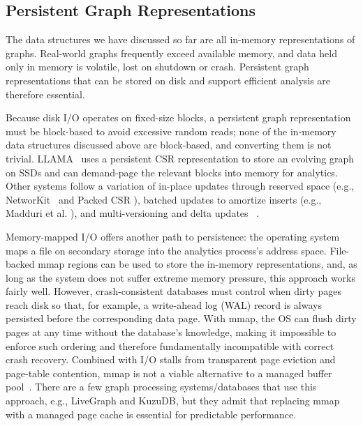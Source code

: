 \subsection{Persistent Graph Representations}
\label{sec:bg:persistent}
The data structures we have discussed so far are all in-memory representations of graphs.
Real-world graphs frequently exceed available memory, and data held only in memory is volatile, lost on shutdown or crash.
Persistent graph representations that can be stored on disk and support efficient analysis are therefore essential.

Because disk I/O operates on fixed-size blocks, a persistent graph representation must be block-based to avoid excessive random reads; none of the in-memory data structures discussed above are block-based, and converting them is not trivial.
LLAMA~\cite{llama} uses a persistent CSR representation to store an evolving graph on SSDs and can demand-page the relevant blocks into memory for analytics.
Other systems follow a variation of in-place updates through reserved space (e.g., NetworKit~\cite{staudt2014networkit} and Packed CSR \cite{PackedCSR}), batched updates to amortize inserts (e.g., Madduri et al. \cite{madduri2009compact}), and multi-versioning and delta updates ~\cite{csr++2020Firmli,llama}.

Memory-mapped I/O offers another path to persistence: the operating system maps a file on secondary storage into the analytics process's address space.
File-backed mmap regions can be used to store the in-memory representations, and, as long as the system does not suffer extreme memory pressure, this approach works fairly well.
However, crash-consistent databases must control when dirty pages reach disk so that, for example, a write-ahead log (WAL) record is always persisted before the corresponding data page.
With mmap, the OS can flush dirty pages at any time without the database's knowledge, making it impossible to enforce such ordering and therefore fundamentally incompatible with correct crash recovery.
Combined with I/O stalls from transparent page eviction and page-table contention, mmap is not a viable alternative to a managed buffer pool~\cite{crotty2022you}.
There are a few graph processing systems/databases that use this approach, e.g., LiveGraph\cite{zhu2019livegraph} and KuzuDB\cite{feng2023kuzu}, but they admit that replacing mmap with a managed page cache is essential for predictable performance\cite[Section 6]{zhu2019livegraph}.

